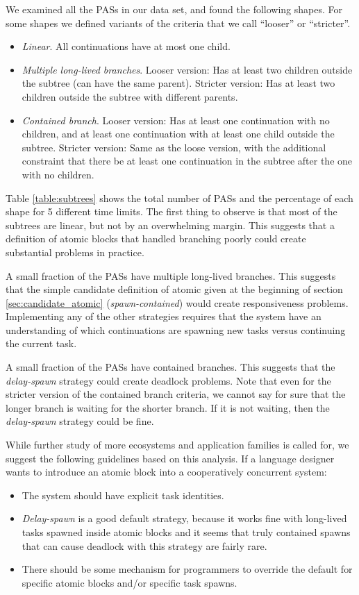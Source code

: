 \documentclass[acmsmall,anonymous,review]{acmart}\settopmatter{printfolios=true,printccs=false,printacmref=false}
\begin{document}
We examined all the PASs in our data set, and found the following shapes.
For some shapes we defined variants of the criteria that we call ``looser'' or ``stricter''.

\begin{itemize}
\item \emph{Linear}. All continuations have at most one child.
\item \emph{Multiple long-lived branches}. Looser version: Has at least two children outside the subtree (can have the same parent).
Stricter version: Has at least two children outside the subtree with different parents.
\item \emph{Contained branch}. Looser version: Has at least one continuation with no children, and at least one continuation with at least one child outside the subtree.
  Stricter version: Same as the loose version, with the additional constraint that there be at least one continuation in the subtree after the one with no children.
\end{itemize}

Table \ref{table:subtrees} shows the total number of PASs and the percentage of each shape for 5 different time limits.
The first thing to observe is that most of the subtrees are linear, but not by an overwhelming margin.
This suggests that a definition of atomic blocks that handled branching poorly could create substantial problems in practice.

A small fraction of the PASs have multiple long-lived branches.
This suggests that the simple candidate definition of atomic given at the beginning of section \ref{sec:candidate_atomic} (\emph{spawn-contained}) would create responsiveness problems.
Implementing any of the other strategies requires that the system have an understanding of which continuations are spawning new tasks versus continuing the current task.

A small fraction of the PASs have contained branches.
This suggests that the \emph{delay-spawn} strategy could create deadlock problems.
Note that even for the stricter version of the contained branch criteria, we cannot say for sure that the longer branch is waiting for the shorter branch.
If it is not waiting, then the \emph{delay-spawn} strategy could be fine.

While further study of more ecosystems and application families is called for, we suggest the following guidelines based on this analysis.
If a language designer wants to introduce an atomic block into a cooperatively concurrent system:
\begin{itemize}
\item The system should have explicit task identities.
\item \emph{Delay-spawn} is a good default strategy, because it works fine with long-lived tasks spawned inside atomic blocks and it seems that truly contained spawns that can cause deadlock with this strategy are fairly rare.
\item There should be some mechanism for programmers to override the default for specific atomic blocks and/or specific task spawns.
\end{itemize}
\end{document}
